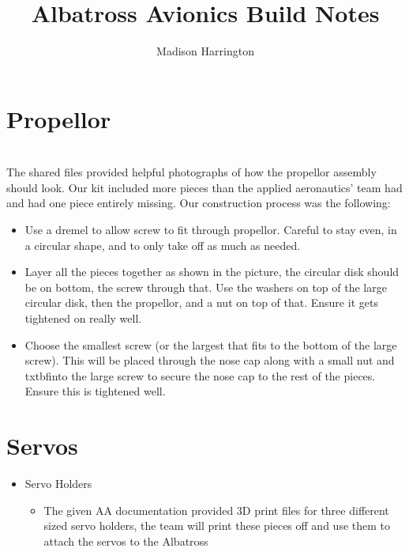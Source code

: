 \documentclass{article}
\begin{document}
\title{Albatross Avionics Build Notes}
\author{Madison Harrington}
\maketitle

\section{Propellor} \\

The shared files provided helpful photographs of how the propellor assembly should look. Our kit included more pieces than the applied aeronautics' team had and had one piece entirely missing. Our construction process was the following: 

\begin{itemize}

\item Use a dremel to allow screw to fit through propellor. Careful to stay even, in a circular shape, and to only take off as much as needed. 
\item Layer all the pieces together as shown in the picture, the circular disk should be on bottom, the screw through that. Use the washers
on top of the large circular disk, then the propellor, and a nut on top of that. Ensure it gets tightened on really well. 
\item Choose the smallest screw (or the largest that fits to the bottom of the large screw). This will be placed through the nose cap 
along with a small nut and txtbf{into the large screw} to secure the nose cap to the rest of the pieces. Ensure this is tightened well.

\end{itemize}



\section{Servos}

\begin{itemize} 

\item Servo Holders

   \begin {itemize}
   
   \item The given AA documentation provided 3D print files for three different sized servo holders, the team will print these    
   pieces off and use them to attach the servos to the Albatross
   
   \end{itemize}
   
\end{itemize}  
\end{document}
